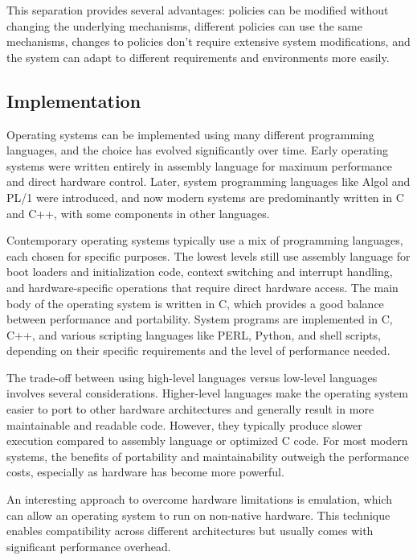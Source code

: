     This separation provides several advantages: policies can be modified without changing the underlying mechanisms, different policies can use the same mechanisms, changes to policies don't require extensive system modifications, and the system can adapt to different requirements and environments more easily.


\subsection{Implementation}

    Operating systems can be implemented using many different programming languages, and the choice has evolved significantly over time. Early operating systems were written entirely in assembly language for maximum performance and direct hardware control. Later, system programming languages like Algol and PL/1 were introduced, and now modern systems are predominantly written in C and C++, with some components in other languages.
    
    Contemporary operating systems typically use a mix of programming languages, each chosen for specific purposes. The lowest levels still use assembly language for boot loaders and initialization code, context switching and interrupt handling, and hardware-specific operations that require direct hardware access. The main body of the operating system is written in C, which provides a good balance between performance and portability. System programs are implemented in C, C++, and various scripting languages like PERL, Python, and shell scripts, depending on their specific requirements and the level of performance needed.
    
    The trade-off between using high-level languages versus low-level languages involves several considerations. Higher-level languages make the operating system easier to port to other hardware architectures and generally result in more maintainable and readable code. However, they typically produce slower execution compared to assembly language or optimized C code. For most modern systems, the benefits of portability and maintainability outweigh the performance costs, especially as hardware has become more powerful.
    
    An interesting approach to overcome hardware limitations is emulation, which can allow an operating system to run on non-native hardware. This technique enables compatibility across different architectures but usually comes with significant performance overhead.


